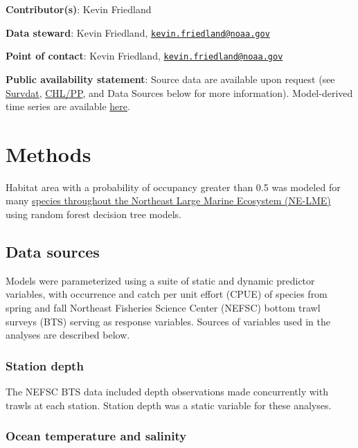 \documentclass[
]{book}
\begin{document}
\textbf{Contributor(s)}: Kevin Friedland

\textbf{Data steward}: Kevin Friedland, \href{mailto:kevin.friedland@noaa.gov}{\nolinkurl{kevin.friedland@noaa.gov}}

\textbf{Point of contact}: Kevin Friedland, \href{mailto:kevin.friedland@noaa.gov}{\nolinkurl{kevin.friedland@noaa.gov}}

\textbf{Public availability statement}: Source data are available upon request (see \protect\hyperlink{survdat}{Survdat}, \protect\hyperlink{chl-pp}{CHL/PP}, and Data Sources below for more information). Model-derived time series are available \href{https://comet.nefsc.noaa.gov/erddap/tabledap/SOE_habitat_soe_v1.html}{here}.

\hypertarget{methods-27}{%
\section{Methods}\label{methods-27}}

Habitat area with a probability of occupancy greater than 0.5 was modeled for many \href{https://www.nefsc.noaa.gov/ecosys/current-conditions/occupancy-change.html}{species throughout the Northeast Large Marine Ecosystem (NE-LME)} using random forest decision tree models.

\hypertarget{data-sources-27}{%
\subsection{Data sources}\label{data-sources-27}}

Models were parameterized using a suite of static and dynamic predictor variables, with occurrence and catch per unit effort (CPUE) of species from spring and fall Northeast Fisheries Science Center (NEFSC) bottom trawl surveys (BTS) serving as response variables. Sources of variables used in the analyses are described below.

\hypertarget{station-depth}{%
\subsubsection{Station depth}\label{station-depth}}

The NEFSC BTS data included depth observations made concurrently with trawls at each station. Station depth was a static variable for these analyses.

\hypertarget{ocean-temperature-and-salinity}{%
\subsubsection{Ocean temperature and salinity}\label{ocean-temperature-and-salinity}}
\end{document}
